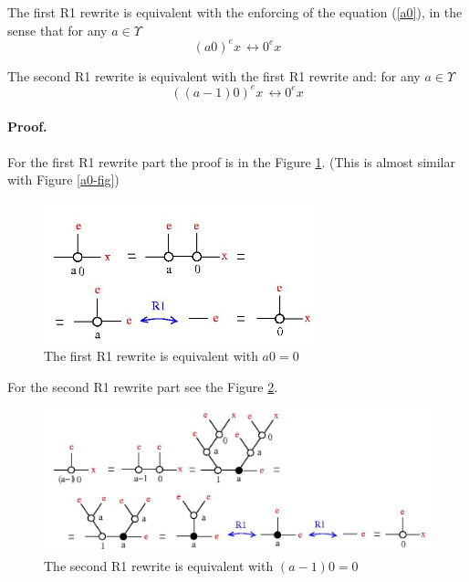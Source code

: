 \begin{proposition}
The first R1 rewrite is equivalent with the enforcing of the equation (\ref{a0}), in the sense that for any $a \in \Upsilon$ 
\begin{equation}
 (a 0)^{e} x \, \longleftrightarrow 0^{e} x 
\label{a01r1}
\end{equation}

The second R1 rewrite is equivalent with the first R1 rewrite and:  for any $a \in \Upsilon$ 
\begin{equation}
 ((a-1) 0)^{e} x \, \longleftrightarrow 0^{e} x 
\label{a02r1}
\end{equation}
\end{proposition}

 
\paragraph{Proof.} For the first R1 rewrite part the proof is  in the Figure \ref{a0r1-fig}. (This is almost similar with Figure \ref{a0-fig})
\begin{figure}[h]\centerline{\includegraphics[width=80mm]{jpg/a0r1.jpg}}  \caption{ The first R1 rewrite is equivalent with $a 0 = 0$ } \label{a0r1-fig} \end{figure}
For the second R1 rewrite part see  the Figure \ref{a-1r1-fig}. 
\begin{figure}[h]\centerline{\includegraphics[width=120mm]{jpg/a-1r1.jpg}}  \caption{ The second R1 rewrite is equivalent with $(a-1) 0 = 0$ } \label{a-1r1-fig} \end{figure}

\vspace{.5cm}


